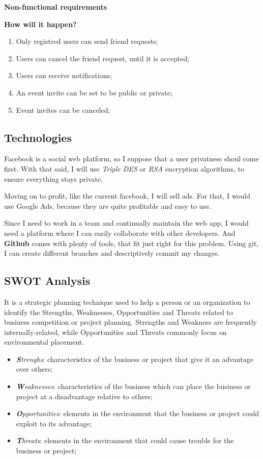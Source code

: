 \documentclass{article}
\begin{document}
			\begin{center}
				\textbf{Non-functional requirements}
			\end{center}

				\textbf{How will it happen?}
				\begin{enumerate}
					\item Only registred users can send friend requests;
					\item Users can cancel the friend request, until it is accepted;
					\item Users can receive notifications;
					\item An event invite can be set to be public or private;
					\item Event invites can be canceled;
				\end{enumerate}

		\subsection{Technologies}
			Facebook is a social web platform, so I suppose that a user privatness shoul come first. With that said, I will use \textit{Triple DES} or \textit{RSA} encryption algorithms, to ensure everything stays private.
		
			Moving on to profit, like the current facebook, I will sell ads. For that, I would use Google Ads, because they are quite profitable and easy to use.

			Since I need to work in a team and continually maintain the web app, I would need a platform where I can easily collaborate with other developers. And \textbf{Github} comes with plenty of tools, that fit just right for this problem. Using git, I can create different branches and descriptively commit my changes.

		\subsection{SWOT Analysis}
			It is a strategic planning technique used to help a person or an organization to identify the Strengths, Weaknesses, Opportunities and Threats related to business competition or project planning. Strengths and Weakness are frequently internally-related, while Opportunities and Threats commonly focus on environmental placement.

			\begin{itemize}
				\item \textit{\textbf{S}trenghs}: characteristics of the business or project that give it an advantage over others;
				\item \textit{\textbf{W}eaknesses}: characteristics of the business which can place the business or project at a disadvantage relative to others;
				\item \textit{\textbf{O}pportunities}: elements in the environment that the business or project could exploit to its advantage;
				\item \textit{\textbf{T}hreats}: elements in the environment that could cause trouble for the business or project;
			\end{itemize}
\end{document}
